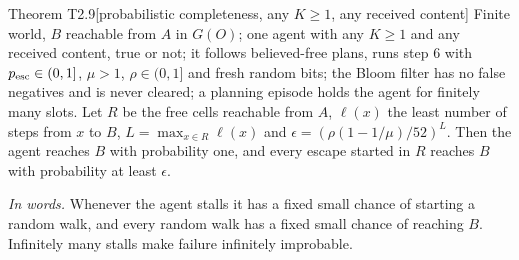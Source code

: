 \documentclass[11pt,a4paper]{article}
\begin{document}
\begin{result}{Theorem T2.9}[probabilistic completeness, any $K\ge1$, any received content]
Finite world, $B$ reachable from $A$ in $G(O)$; one agent with any $K\ge1$ and any received content, true or not; it
follows believed-free plans, runs step 6 with $p_{\rm esc}\in(0,1]$, $\mu>1$, $\rho\in(0,1]$ and fresh random bits;
the Bloom filter has no false negatives and is never cleared; a planning episode holds the agent for finitely many
slots. Let $R$ be the free cells reachable from $A$, $\ell(x)$ the least number of steps from $x$ to $B$,
$L=\max_{x\in R}\ell(x)$ and $\epsilon=(\rho(1-1/\mu)/52)^L$. Then the agent reaches $B$ with probability one, and
every escape started in $R$ reaches $B$ with probability at least $\epsilon$.
\end{result}
\noindent\emph{In words.} Whenever the agent stalls it has a fixed small chance of starting a random walk, and every random walk has a fixed small chance of reaching $B$. Infinitely many stalls make failure infinitely improbable.
\end{document}
